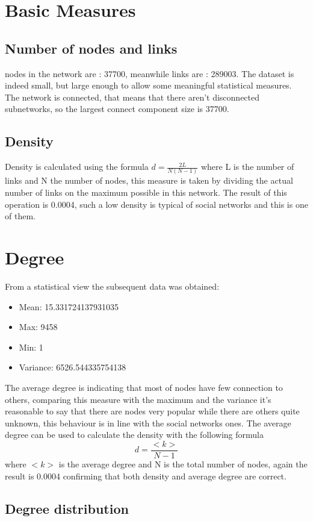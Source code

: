 \documentclass[]{article}
\begin{document}
    \section{Basic Measures}
    
    \subsection*{Number of nodes and links}
    nodes in the network are : 37700, meanwhile links are : 289003. The dataset is indeed small, but large enough to allow some meaningful statistical measures. The network is connected, that means that there aren't disconnected subnetworks, so the largest connect component size is 37700.
    
    \subsection*{Density}
    Density is calculated using the formula $d=\frac{2L}{N(N-1)}$ where L is the number of links and N the number of nodes, this measure is taken by dividing the actual number of links on the maximum possible in this network. The result of this operation is 0.0004, such a low density is typical of social networks and this is one of them.

    \section*{Degree}   
    From a statistical view the subsequent data was obtained:
    \begin{itemize}
        \item Mean: 15.331724137931035
        \item Max: 9458
        \item Min: 1
        \item Variance: 6526.544335754138
    \end{itemize}
    The average degree is indicating that most of nodes have few connection to others, comparing this measure with the maximum and the variance it's reasonable to say that there are nodes very popular while there are others quite unknown, this behaviour is in line with the social networks ones. The average degree can be used to calculate the density with the following formula $$d=\frac{<k>}{N-1}$$ where $<k>$ is the average degree and N is the total number of nodes, again the result is 0.0004 confirming that both density and average degree are correct. 

    \subsection*{Degree distribution}
\end{document}
